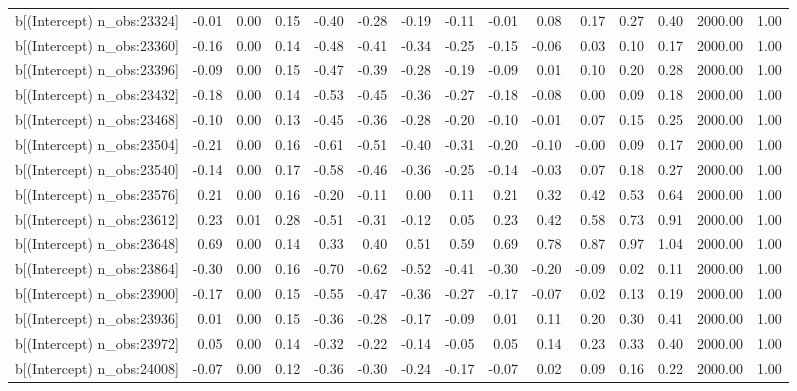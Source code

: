 \begin{table}[ht]
\begin{tabular}{rrrrrrrrrrrrrrr}
  b[(Intercept) n\_obs:23324] & -0.01 & 0.00 & 0.15 & -0.40 & -0.28 & -0.19 & -0.11 & -0.01 & 0.08 & 0.17 & 0.27 & 0.40 & 2000.00 & 1.00 \\ 
  b[(Intercept) n\_obs:23360] & -0.16 & 0.00 & 0.14 & -0.48 & -0.41 & -0.34 & -0.25 & -0.15 & -0.06 & 0.03 & 0.10 & 0.17 & 2000.00 & 1.00 \\ 
  b[(Intercept) n\_obs:23396] & -0.09 & 0.00 & 0.15 & -0.47 & -0.39 & -0.28 & -0.19 & -0.09 & 0.01 & 0.10 & 0.20 & 0.28 & 2000.00 & 1.00 \\ 
  b[(Intercept) n\_obs:23432] & -0.18 & 0.00 & 0.14 & -0.53 & -0.45 & -0.36 & -0.27 & -0.18 & -0.08 & 0.00 & 0.09 & 0.18 & 2000.00 & 1.00 \\ 
  b[(Intercept) n\_obs:23468] & -0.10 & 0.00 & 0.13 & -0.45 & -0.36 & -0.28 & -0.20 & -0.10 & -0.01 & 0.07 & 0.15 & 0.25 & 2000.00 & 1.00 \\ 
  b[(Intercept) n\_obs:23504] & -0.21 & 0.00 & 0.16 & -0.61 & -0.51 & -0.40 & -0.31 & -0.20 & -0.10 & -0.00 & 0.09 & 0.17 & 2000.00 & 1.00 \\ 
  b[(Intercept) n\_obs:23540] & -0.14 & 0.00 & 0.17 & -0.58 & -0.46 & -0.36 & -0.25 & -0.14 & -0.03 & 0.07 & 0.18 & 0.27 & 2000.00 & 1.00 \\ 
  b[(Intercept) n\_obs:23576] & 0.21 & 0.00 & 0.16 & -0.20 & -0.11 & 0.00 & 0.11 & 0.21 & 0.32 & 0.42 & 0.53 & 0.64 & 2000.00 & 1.00 \\ 
  b[(Intercept) n\_obs:23612] & 0.23 & 0.01 & 0.28 & -0.51 & -0.31 & -0.12 & 0.05 & 0.23 & 0.42 & 0.58 & 0.73 & 0.91 & 2000.00 & 1.00 \\ 
  b[(Intercept) n\_obs:23648] & 0.69 & 0.00 & 0.14 & 0.33 & 0.40 & 0.51 & 0.59 & 0.69 & 0.78 & 0.87 & 0.97 & 1.04 & 2000.00 & 1.00 \\ 
  b[(Intercept) n\_obs:23864] & -0.30 & 0.00 & 0.16 & -0.70 & -0.62 & -0.52 & -0.41 & -0.30 & -0.20 & -0.09 & 0.02 & 0.11 & 2000.00 & 1.00 \\ 
  b[(Intercept) n\_obs:23900] & -0.17 & 0.00 & 0.15 & -0.55 & -0.47 & -0.36 & -0.27 & -0.17 & -0.07 & 0.02 & 0.13 & 0.19 & 2000.00 & 1.00 \\ 
  b[(Intercept) n\_obs:23936] & 0.01 & 0.00 & 0.15 & -0.36 & -0.28 & -0.17 & -0.09 & 0.01 & 0.11 & 0.20 & 0.30 & 0.41 & 2000.00 & 1.00 \\ 
  b[(Intercept) n\_obs:23972] & 0.05 & 0.00 & 0.14 & -0.32 & -0.22 & -0.14 & -0.05 & 0.05 & 0.14 & 0.23 & 0.33 & 0.40 & 2000.00 & 1.00 \\ 
  b[(Intercept) n\_obs:24008] & -0.07 & 0.00 & 0.12 & -0.36 & -0.30 & -0.24 & -0.17 & -0.07 & 0.02 & 0.09 & 0.16 & 0.22 & 2000.00 & 1.00 \\ 

\end{tabular}
\end{table}
